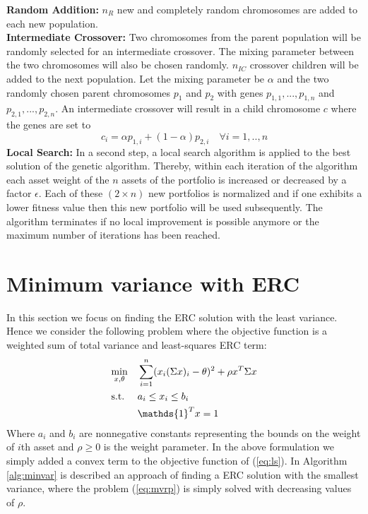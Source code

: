 {\textbf{Random Addition: }$n_R$ new and completely random chromosomes are added to each new population.\\[1\baselineskip]
\textbf{Intermediate Crossover: }Two chromosomes from the parent population will be randomly selected for an intermediate crossover. The mixing parameter between the two chromosomes will also be chosen randomly. $n_{IC}$ crossover children will be added to the next population. Let the mixing parameter be $\alpha$ and the two randomly chosen parent chromosomes $p_1$ and $p_2$ with genes $p_{1,1},...,p_{1,n}$ and $p_{2,1},...,p_{2,n}$. An intermediate crossover will result in a child chromosome $c$ where the genes are set to
\begin{equation}
c_i = \alpha p_{1,i} + (1-\alpha)p_{2,i} \hspace{1em} \forall i=1,..,n
\end{equation}
\textbf{Local Search: }In a second step, a local search algorithm is applied to the best solution of the genetic algorithm. Thereby, within each iteration of the algorithm each asset weight of the $n$ assets of the portfolio is increased or decreased by a factor $\epsilon$. Each of these $(2\times n)$ new portfolios is normalized and if one exhibits a lower fitness value then this new portfolio will be used subsequently. The algorithm terminates if no local improvement is possible anymore or the maximum number of iterations
has been reached.

\section{Minimum variance with ERC}
In this section we focus on finding the ERC solution with the least variance. Hence we consider the following problem where the objective function is a weighted sum of total variance and least-squares ERC term\footnotemark[3]:
\begin{equation}\label{eq:mvrp}
\begin{aligned}
& \underset{x,\theta}{\text{min}}
&&\sum_{i=1}^n (x_i(\Sigma x)_i - \theta)^2 + \rho x^T \Sigma x\\
& \text{s.t.}
&&a_i \leq x_i \leq b_i\vspace{0.5em}\\
&&&\mathds{1}^T x = 1
\end{aligned}
\end{equation}
Where $a_i$ and $b_i$ are nonnegative constants representing the bounds on the weight of $i$th asset and $\rho \geq 0$ is the weight parameter. In the above formulation we simply added a convex term to the objective function of (\ref{eq:ls}). In Algorithm \ref{alg:minvar} is described an approach of finding a ERC solution with the smallest variance, where the problem (\ref{eq:mvrp}) is simply solved with decreasing values of $\rho$.

}
